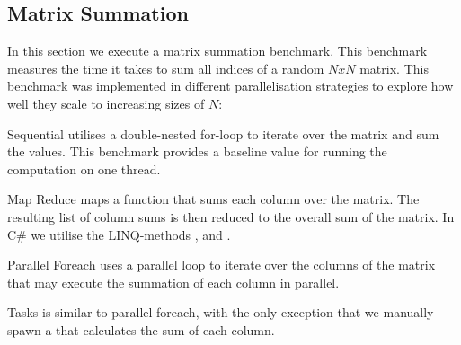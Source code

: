 \newcommand{\workBiasSymbolics}{\symbolic{Work Bias (iterations),134217728,67108864,33554432,16777216,8388608,4194304,2097152,1048576,524288,262144,131072,65536,32768,16384,8192,4096,2048,1024}}


\subsection{Matrix Summation}
In this section we execute a matrix summation benchmark. This benchmark measures the time it takes to sum all indices of a random $N x N$ matrix. This benchmark was implemented in different parallelisation strategies to explore how well they scale to increasing sizes of $N$:

\begin{labeling}{\quad\quad}
    \item[Sequential] utilises a double-nested for-loop to iterate over the matrix and sum the values. This benchmark provides a baseline value for running the computation on one thread.
    \item[Map Reduce] maps a function that sums each column over the matrix. The resulting list of column sums is then reduced to the overall sum of the matrix. In C\# we utilise the \gls{LINQ}-methods ,  and .
    \item[Parallel Foreach] uses a parallel loop to iterate over the columns of the matrix that may execute the summation of each column in parallel. 
    \item[Tasks] is similar to parallel foreach, with the only exception that we manually spawn a  that calculates the sum of each column.
\end{labeling}

